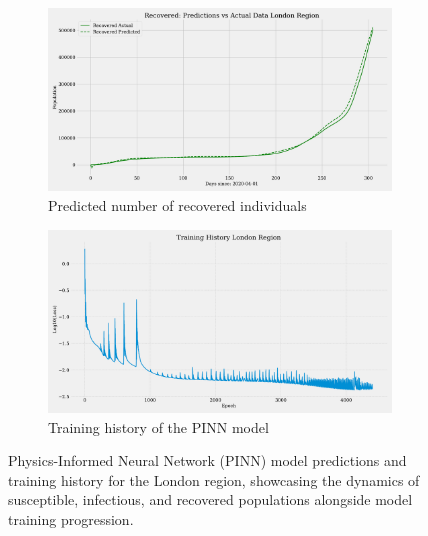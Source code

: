 \documentclass[12pt]{article}
\begin{document}
\begin{figure}[ht]
    \begin{subfigure}[t]{0.45\textwidth}
        \includegraphics[width=\textwidth]{images/pinn/R_predictions_London Region.pdf}
        \caption{Predicted number of recovered individuals}
        \label{fig:R_predictions_London}
    \end{subfigure}
    \hfill %
    \begin{subfigure}[t]{0.45\textwidth}
        \centering
        \includegraphics[width=\textwidth]{images/pinn/Training_History_London Region.pdf}
        \caption{Training history of the PINN model}
        \label{fig:Training_History_London}
    \end{subfigure}
    \caption{Physics-Informed Neural Network (PINN) model predictions and training history for the London region, showcasing the dynamics of susceptible, infectious, and recovered populations alongside model training progression.}
    \label{fig:PINN_London_Comprehensive}
\end{figure}
\end{document}
